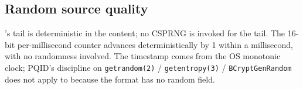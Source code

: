 \subsection{Random source quality}

\pqhash{}'s tail is deterministic in the content; no CSPRNG is invoked for the tail. The 16-bit per-millisecond counter advances deterministically by 1 within a millisecond, with no randomness involved. The timestamp comes from the OS monotonic clock; PQID's discipline on \texttt{getrandom(2)} / \texttt{getentropy(3)} / \texttt{BCryptGenRandom} does not apply to \pqhash{} because the format has no random field.
